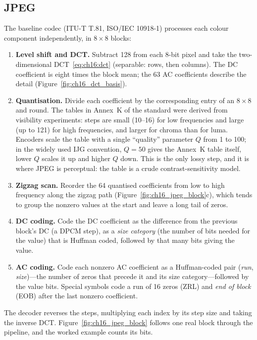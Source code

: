 \subsection{JPEG}

The baseline  codec (ITU-T T.81, ISO/IEC 10918-1) processes each colour component
independently, in $8\times8$ blocks:
\begin{enumerate}[nosep]
\item \textbf{Level shift and DCT.} Subtract 128 from each 8-bit pixel and take the two-dimensional
DCT~\eqref{eq:ch16:dct} (separable: rows, then columns). The DC coefficient is eight times the block
mean; the 63 AC coefficients describe the detail (Figure~\ref{fig:ch16_dct_basis}).
\item \textbf{Quantisation.} Divide each coefficient by the corresponding entry of an $8\times8$
 and round. The tables in Annex~K of the standard were derived from
visibility experiments: steps are small (10--16) for low frequencies and large (up to 121) for high
frequencies, and larger for chroma than for luma. Encoders scale the table with a single ``quality''
parameter $Q$ from 1 to 100; in the widely used IJG convention, $Q=50$ gives the Annex~K table itself,
lower $Q$ scales it up and higher $Q$ down. This is the only lossy step, and it is where JPEG is
perceptual: the table is a crude contrast-sensitivity model.
\item \textbf{Zigzag scan.} Reorder the 64 quantised coefficients from low to high frequency along the
zigzag path (Figure~\ref{fig:ch16_jpeg_block}c), which tends to group the nonzero values at the start
and leave a long tail of zeros.
\item \textbf{DC coding.} Code the DC coefficient as the difference from the previous block's DC
(a DPCM step), as a \emph{size category} (the number of bits needed for the value) that is Huffman
coded, followed by that many bits giving the value.
\item \textbf{AC coding.} Code each nonzero AC coefficient as a Huffman-coded pair (\emph{run},
\emph{size})---the number of zeros that precede it and its size category---followed by the value bits.
Special symbols code a run of 16 zeros (ZRL) and \emph{end of block} (EOB) after the last nonzero
coefficient.
\end{enumerate}
The decoder reverses the steps, multiplying each index by its step size and taking the inverse DCT.
Figure~\ref{fig:ch16_jpeg_block} follows one real block through the pipeline, and the worked example
counts its bits.

